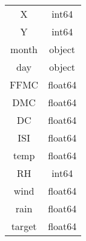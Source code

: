 \begin{tabular}{ c c }
 X          & int64 \\
 Y          & int64 \\ 
 month     & object \\ 
 day       & object \\ 
 FFMC     & float64 \\
 DMC      & float64 \\
 DC       & float64 \\
 ISI      & float64 \\
 temp     & float64 \\
 RH       & int64 \\
 wind     & float64 \\
 rain     & float64 \\
 target   & float64 \\
\end{tabular}